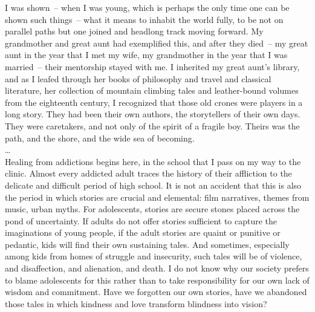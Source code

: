 \documentclass[10pt,DIV09,letterpaper,oneside,headsepline]{scrreprt}
\begin{document}
I was shown~-- when I was young, which is perhaps the only time one can be shown such things~-- what it means to inhabit the world fully, to be not on parallel paths but one joined and headlong track moving forward. My grandmother and great aunt had exemplified this, and after they died~-- my great aunt in the year that I met my wife, my grandmother in the year that I was married~-- their mentorship stayed with me. I inherited my great aunt's library, and as I leafed through her books of philosophy and travel and classical literature, her collection of mountain climbing tales and leather-bound volumes from the eighteenth century, I recognized that those old crones were players in a long story. They had been their own authors, the storytellers of their own days. They were caretakers, and not only of the spirit of a fragile boy. Theirs was the path, and the shore, and the wide sea of becoming.
\\
\ldots
\\
Healing from addictions begins here, in the school that I pass on my way to the clinic. Almost every addicted adult traces the history of their affliction to the delicate and difficult period of high school. It is not an accident that this is also the period in which stories are crucial and elemental: film narratives, themes from music, urban myths. For adolescents, stories are secure stones placed across the pond of uncertainty. If adults do not offer stories sufficient to capture the imaginations of young people, if the adult stories are quaint or punitive or pedantic, kids will find their own sustaining tales. And sometimes, especially among kids from homes of struggle and insecurity, such tales will be of violence, and disaffection, and alienation, and death. I do not know why our society prefers to blame adolescents for this rather than to take responsibility for our own lack of wisdom and commitment. Have we forgotten our own stories, have we abandoned those tales in which kindness and love transform blindness into vision?
\end{document}
